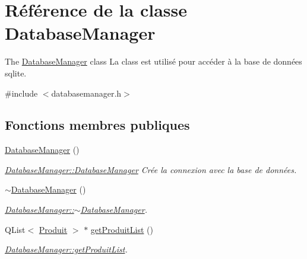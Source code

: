 \hypertarget{classDatabaseManager}{}\section{Référence de la classe Database\+Manager}
\label{classDatabaseManager}


The \hyperlink{classDatabaseManager}{Database\+Manager} class La class est utilisé pour accéder à la base de données sqlite.  




{\ttfamily \#include $<$databasemanager.\+h$>$}

\subsection*{Fonctions membres publiques}
\begin{DoxyCompactItemize}
\item 
\mbox{\label{classDatabaseManager_aa162d97472e6c31a4e873adda435dbb6}} 
\hyperlink{classDatabaseManager_aa162d97472e6c31a4e873adda435dbb6}{Database\+Manager} ()
\begin{DoxyCompactList}\small\item\em \hyperlink{classDatabaseManager_aa162d97472e6c31a4e873adda435dbb6}{Database\+Manager\+::\+Database\+Manager} Crée la connexion avec la base de données. \end{DoxyCompactList}\item 
\mbox{\label{classDatabaseManager_ae9b3a5da1e04fbb00faf8a034da1d063}} 
\hyperlink{classDatabaseManager_ae9b3a5da1e04fbb00faf8a034da1d063}{$\sim$\+Database\+Manager} ()
\begin{DoxyCompactList}\small\item\em \hyperlink{classDatabaseManager_ae9b3a5da1e04fbb00faf8a034da1d063}{Database\+Manager\+::$\sim$\+Database\+Manager}. \end{DoxyCompactList}\item 
Q\+List$<$ \hyperlink{classProduit}{Produit} $>$ $\ast$ \hyperlink{classDatabaseManager_a00bdab5cbbf85a15d297706509b474af}{get\+Produit\+List} ()
\begin{DoxyCompactList}\small\item\em \hyperlink{classDatabaseManager_a00bdab5cbbf85a15d297706509b474af}{Database\+Manager\+::get\+Produit\+List}. \end{DoxyCompactList}\end{DoxyCompactItemize}


